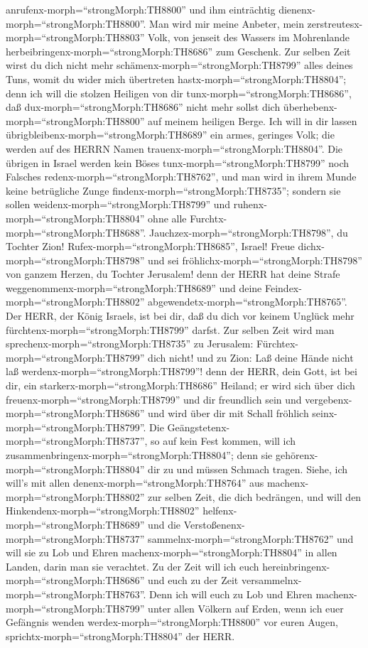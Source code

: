 anrufenx-morph=``strongMorph:TH8800'' und ihm einträchtig
dienenx-morph=``strongMorph:TH8800''.  Man wird mir meine
Anbeter, mein zerstreutesx-morph=``strongMorph:TH8803'' Volk, von
jenseit des Wassers im Mohrenlande
herbeibringenx-morph=``strongMorph:TH8686'' zum Geschenk. 
Zur selben Zeit wirst du dich nicht mehr
schämenx-morph=``strongMorph:TH8799'' alles deines Tuns, womit du wider
mich übertreten hastx-morph=``strongMorph:TH8804''; denn ich will die
stolzen Heiligen von dir tunx-morph=``strongMorph:TH8686'', daß
dux-morph=``strongMorph:TH8686'' nicht mehr sollst dich
überhebenx-morph=``strongMorph:TH8800'' auf meinem heiligen Berge.
 Ich will in dir lassen
übrigbleibenx-morph=``strongMorph:TH8689'' ein armes, geringes Volk; die
werden auf des HERRN Namen trauenx-morph=``strongMorph:TH8804''.
 Die übrigen in Israel werden kein Böses
tunx-morph=``strongMorph:TH8799'' noch Falsches
redenx-morph=``strongMorph:TH8762'', und man wird in ihrem Munde keine
betrügliche Zunge findenx-morph=``strongMorph:TH8735''; sondern sie
sollen weidenx-morph=``strongMorph:TH8799'' und
ruhenx-morph=``strongMorph:TH8804'' ohne alle
Furchtx-morph=``strongMorph:TH8688''. 
Jauchzex-morph=``strongMorph:TH8798'', du Tochter Zion!
Rufex-morph=``strongMorph:TH8685'', Israel! Freue
dichx-morph=``strongMorph:TH8798'' und sei
fröhlichx-morph=``strongMorph:TH8798'' von ganzem Herzen, du Tochter
Jerusalem!  denn der HERR hat deine Strafe
weggenommenx-morph=``strongMorph:TH8689'' und deine
Feindex-morph=``strongMorph:TH8802''
abgewendetx-morph=``strongMorph:TH8765''. Der HERR, der König Israels,
ist bei dir, daß du dich vor keinem Unglück mehr
fürchtenx-morph=``strongMorph:TH8799'' darfst.  Zur selben
Zeit wird man sprechenx-morph=``strongMorph:TH8735'' zu Jerusalem:
Fürchtex-morph=``strongMorph:TH8799'' dich nicht! und zu Zion: Laß deine
Hände nicht laß werdenx-morph=``strongMorph:TH8799''!  denn
der HERR, dein Gott, ist bei dir, ein
starkerx-morph=``strongMorph:TH8686'' Heiland; er wird sich über dich
freuenx-morph=``strongMorph:TH8799'' und dir freundlich sein und
vergebenx-morph=``strongMorph:TH8686'' und wird über dir mit Schall
fröhlich seinx-morph=``strongMorph:TH8799''.  Die
Geängstetenx-morph=``strongMorph:TH8737'', so auf kein Fest kommen, will
ich zusammenbringenx-morph=``strongMorph:TH8804''; denn sie
gehörenx-morph=``strongMorph:TH8804'' dir zu und müssen Schmach tragen.
 Siehe, ich will's mit allen
denenx-morph=``strongMorph:TH8764'' aus
machenx-morph=``strongMorph:TH8802'' zur selben Zeit, die dich
bedrängen, und will den Hinkendenx-morph=``strongMorph:TH8802''
helfenx-morph=``strongMorph:TH8689'' und die
Verstoßenenx-morph=``strongMorph:TH8737''
sammelnx-morph=``strongMorph:TH8762'' und will sie zu Lob und Ehren
machenx-morph=``strongMorph:TH8804'' in allen Landen, darin man sie
verachtet.  Zu der Zeit will ich euch
hereinbringenx-morph=``strongMorph:TH8686'' und euch zu der Zeit
versammelnx-morph=``strongMorph:TH8763''. Denn ich will euch zu Lob und
Ehren machenx-morph=``strongMorph:TH8799'' unter allen Völkern auf
Erden, wenn ich euer Gefängnis wenden
werdex-morph=``strongMorph:TH8800'' vor euren Augen,
sprichtx-morph=``strongMorph:TH8804'' der HERR.
